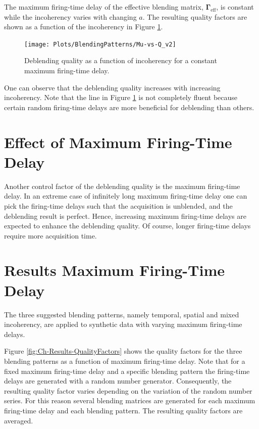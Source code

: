 The maximum firing-time delay of the effective blending matrix, $\mathbf{\Gamma}_{\mathrm{eff}}$, is constant while the incoherency  varies with changing $a$. The resulting quality factors are shown as a function of the incoherency in Figure \ref{fig:Ch-Results-Quality-vs-Incoherency}.


\begin{figure}
	\centering
	\texttt{[image: Plots/BlendingPatterns/Mu-vs-Q\_v2]}
	\caption{Deblending quality as a function of incoherency for a constant maximum firing-time delay.}
	\label{fig:Ch-Results-Quality-vs-Incoherency}
\end{figure}

One can observe that the deblending quality increases with increasing incoherency. Note that the line in Figure \ref{fig:Ch-Results-Quality-vs-Incoherency} is not completely fluent because certain random firing-time delays are more beneficial for deblending than others.

\section{Effect of Maximum Firing-Time Delay}

Another control factor of the deblending quality is the maximum firing-time delay. In an extreme case of infinitely long maximum firing-time delay one can pick the firing-time delays such that the acquisition is unblended, and the deblending result is perfect. Hence, increasing maximum firing-time delays are expected to enhance the deblending quality. Of course, longer firing-time delays require more acquisition time.



\section{Results Maximum Firing-Time Delay}

The three suggested blending patterns, namely temporal, spatial and mixed incoherency, are applied to synthetic data with varying maximum firing-time delays. 

Figure \ref{fig:Ch-Results-QualityFactors} shows the quality factors for the three blending patterns as a function of maximum firing-time delay. Note that for a fixed maximum firing-time delay and a specific blending pattern the firing-time delays are generated with a random number generator. Consequently, the resulting quality factor varies depending on the variation of the random number series. For this reason several blending matrices are generated for each maximum firing-time delay and each blending pattern. The resulting quality factors are averaged.

